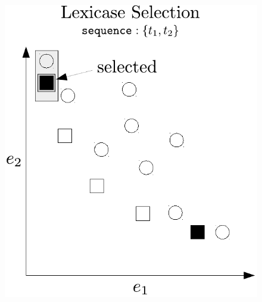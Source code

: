 \documentclass[twoside]{article}
\begin{document}
\begin{figure}[htb]

\begin{minipage}{0.49\textwidth}
\centering
  \includegraphics[width = \textwidth]{figs/lex_pareto.pdf}
\end{minipage}
\hspace{0.02\textwidth}
\begin{minipage}{0.49\textwidth}
\centering

\end{minipage}
\end{figure}
\end{document}
